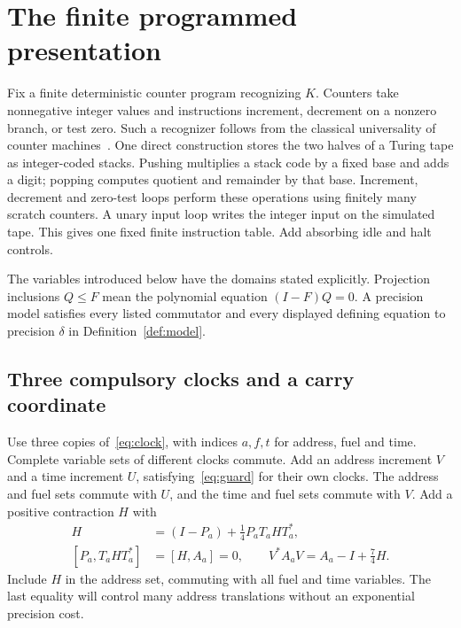 \section{The finite programmed presentation}\label{sec:source}
Fix a finite deterministic counter program recognizing $K$. Counters take nonnegative integer values and instructions increment, decrement on a nonzero branch, or test zero. Such a recognizer follows from the classical universality of counter machines~\cite{SS63}. One direct construction stores the two halves of a Turing tape as integer-coded stacks. Pushing multiplies a stack code by a fixed base and adds a digit; popping computes quotient and remainder by that base. Increment, decrement and zero-test loops perform these operations using finitely many scratch counters. A unary input loop writes the integer input on the simulated tape. This gives one fixed finite instruction table. Add absorbing idle and halt controls.

The variables introduced below have the domains stated explicitly. Projection inclusions $Q\le F$ mean the polynomial equation $(I-F)Q=0$. A precision model satisfies every listed commutator and every displayed defining equation to precision $\delta$ in Definition~\ref{def:model}.

\subsection{Three compulsory clocks and a carry coordinate}
Use three copies of~\eqref{eq:clock}, with indices $a,f,t$ for address, fuel and time. Complete variable sets of different clocks commute. Add an address increment $V$ and a time increment $U$, satisfying~\eqref{eq:guard} for their own clocks. The address and fuel sets commute with $U$, and the time and fuel sets commute with $V$. Add a positive contraction $H$ with
\begin{align}
 H&=(I-P_a)+\tfrac14P_aT_aHT_a^*,\label{eq:carry-rec}\\
 [P_a,T_aHT_a^*]&=[H,A_a]=0,\qquad
 V^*A_aV=A_a-I+\tfrac74H.\label{eq:carry-step}
\end{align}
Include $H$ in the address set, commuting with all fuel and time variables. The last equality will control many address translations without an exponential precision cost.

